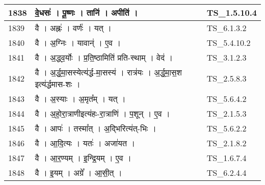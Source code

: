 \documentclass[17pt]{extarticle}
\begin{document}
\begin{longtable}{||p{0.4in}||p{4.9in}||p{0.9in}||}
    \hline
        
    1838 & वे॒धसः॑   ।   पू॒ष्णः   ।   तानि॑   ।   अपीति॑   ।    & TS\_1.5.10.4       \\
    
    \hline
        
    1839 & वै   ।   अह्नः॑   ।   वर्णः॑   ।   यत्   ।    & TS\_6.1.3.2       \\
    
    \hline
        
    1840 & वै   ।   अ॒ग्निः   ।   यावान्॑   ।   ए॒व   ।    & TS\_5.4.10.2       \\
    
    \hline
        
    1841 & वै   ।   अ॒द्ध्व॒र्योः   ।   प्र॒ति॒ष्ठामिति॑ प्रति{-}स्थाम्   ।   वेद॑   ।    & TS\_3.1.2.3       \\
    
    \hline
        
    1842 & वै   ।   अ॒र्द्ध॒मा॒सस्येत्य॑र्द्ध{-}मा॒सस्य॑   ।   रात्र॑यः   ।   अ॒र्द्ध॒मा॒स॒श इत्य॑र्द्धमास{-}शः   ।    & TS\_2.5.8.3       \\
    
    \hline
        
    1843 & वै   ।   अ॒स्याः   ।   अ॒मृत᳚म्   ।   यत्   ।    & TS\_5.6.4.2       \\
    
    \hline
        
    1844 & वै   ।   अ॒हो॒रा॒त्राणीइत्य॑हः{-}रा॒त्राणि॑   ।   प॒शून्   ।   ए॒व   ।    & TS\_2.1.5.3       \\
    
    \hline
        
    1845 & वै   ।   आपः॑   ।   तस्मा᳚त्   ।   अ॒द्भिरित्य॑त्{-}भिः   ।    & TS\_5.6.2.2       \\
    
    \hline
        
    1846 & वै   ।   आ॒दि॒त्यः   ।   यतः॑   ।   अजा॑यत   ।    & TS\_2.1.8.2       \\
    
    \hline
        
    1847 & वै   ।   आ॒र॒ण्यम्   ।   इ॒न्द्रि॒यम्   ।   ए॒व   ।    & TS\_1.6.7.4       \\
    
    \hline
        
    1848 & वै   ।   इ॒यम्   ।   अग्रे᳚   ।   आ॒सी॒त्   ।    & TS\_6.2.4.4       \\
    

\end{longtable}
\end{document}
